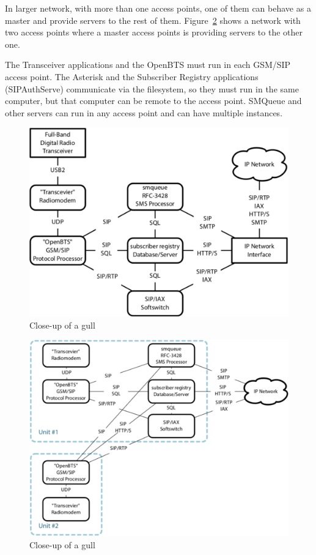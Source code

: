 In larger network, with more than one access points, one of them can behave as a master and provide servers to the rest of them.
Figure~\ref{fig:btsLarge} shows a network with two access points where
a master access points is providing servers to the other one.

The Transceiver applications and the OpenBTS must run in each GSM/SIP access point. 
The Asterisk and the Subscriber Registry applications (SIPAuthServe) 
communicate via the filesystem, so they must run in the same computer,
but that computer can be remote to the access point. 
SMQueue and other servers can run in any access point and can have 
multiple instances.
\begin{figure}
  \centering
    \includegraphics[width=\textwidth]{btsSimple}
  \caption{Close-up of a gull}
  \label{fig:btsSimple}
\end{figure}

\begin{figure}
  \centering
    \includegraphics[width=\textwidth]{btsLarge}
  \caption{Close-up of a gull}
  \label{fig:btsLarge}
\end{figure}
